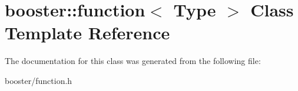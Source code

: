 \section{booster\+:\+:function$<$ Type $>$ Class Template Reference}
\label{classbooster_1_1function}


The documentation for this class was generated from the following file\+:\begin{DoxyCompactItemize}
\item 
booster/function.\+h\end{DoxyCompactItemize}
